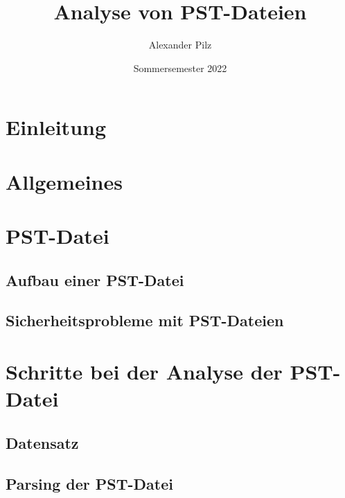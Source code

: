 \documentclass[oneside, 11pt, notitlepage, a4paper, numbers=noenddot]{scrartcl}
\title {Analyse von PST-Dateien}
\author{Alexander Pilz}
\date  {Sommersemester 2022}
\begin{document}
\maketitle

\section{Einleitung}

\label{Einleitung}

\section{Allgemeines}

\label{Allgemeines}

\section{PST-Datei}

\label{PST-Datei}

\subsection{Aufbau einer PST-Datei}

\label{Aufbau einer PST-Datei}

\subsection{Sicherheitsprobleme mit PST-Dateien}

\label{Sicherheitsprobleme mit PST-Dateien}

\section{Schritte bei der Analyse der PST-Datei}

\label{Schritte bei der Analyse der PST-Datei}

\subsection{Datensatz}

\label{Datensatz}

\subsection{Parsing der PST-Datei}

\label{Parsing der PST-Datei}
\end{document}
